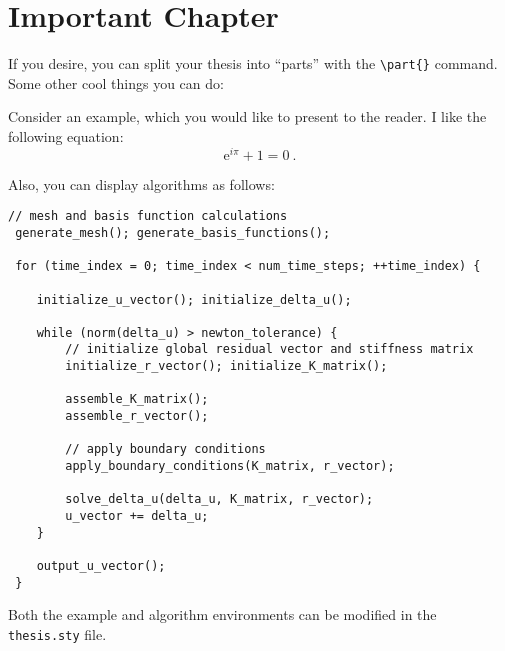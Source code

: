 


%
%

\chapter{Important Chapter} \label{chap:chap_important}

If you desire, you can split your thesis into ``parts'' with the \verb+\part{}+ command.
Some other cool things you can do:

\begin{example}
	Consider an example, which you would like to present to the reader.
	I like the following equation:
	\begin{equation*}
		\mathrm{e}^{i \pi} + 1 = 0
		~.
	\end{equation*}
\end{example}

Also, you can display algorithms as follows:

\begin{lstlisting}[caption={\texttt{C++} pseudocode of an algorithm}]
 // mesh and basis function calculations
 generate_mesh(); generate_basis_functions();

 for (time_index = 0; time_index < num_time_steps; ++time_index) {

	initialize_u_vector(); initialize_delta_u();

	while (norm(delta_u) > newton_tolerance) {
		// initialize global residual vector and stiffness matrix
		initialize_r_vector(); initialize_K_matrix();

		assemble_K_matrix();
		assemble_r_vector();

		// apply boundary conditions
		apply_boundary_conditions(K_matrix, r_vector);

		solve_delta_u(delta_u, K_matrix, r_vector);
		u_vector += delta_u;
	}

	output_u_vector();
 }
\end{lstlisting}

Both the example and algorithm environments can be modified in the \texttt{thesis.sty} file.

